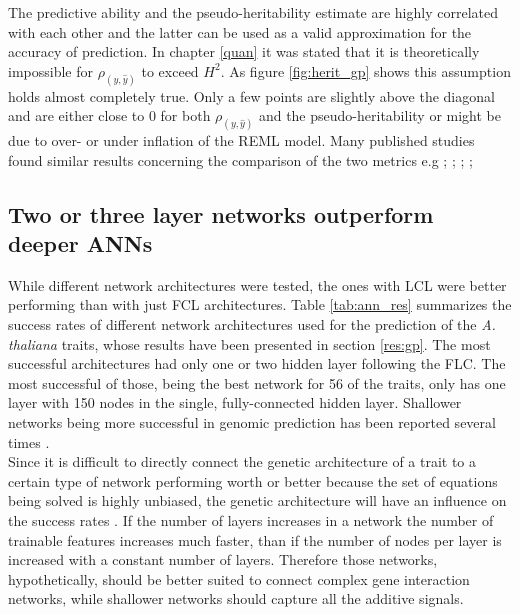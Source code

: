 The predictive ability and the pseudo-heritability estimate are highly correlated with each other
and the latter can be used as a valid approximation for the accuracy of prediction. In
chapter \ref{quan} it was stated that it is theoretically impossible for
$\rho_{(y,\hat{y})}$ to exceed $H^2$. As figure \ref{fig:herit_gp} shows this assumption
holds almost completely true. Only a few points are slightly above the diagonal and are
either close to 0 for both $\rho_{(y,\hat{y})}$ and the pseudo-heritability or might be
due to over- or under inflation of the REML model. Many published studies found similar
results concerning the comparison of the two metrics e.g \cite{kwong2017genomic}; \cite{morgante2018effect}; \cite{yap2018misestimation}; \cite{piaskowski2018genomic}; \cite{zhang2019factors}


\subsection{Two or three layer networks outperform deeper ANNs}

While different network architectures were tested, the ones with LCL were better performing
than with just FCL architectures. Table \ref{tab:ann_res} summarizes the success rates of
different network architectures used for the prediction of the \textit{A. thaliana}
traits, whose results have been presented in section \ref{res:gp}. The most successful
architectures had only one or two hidden layer following the FLC. The most successful of
those, being the best network for 56 of the traits, only has one layer with 150 nodes in
the single, fully-connected hidden layer. Shallower networks being more successful
in genomic prediction has been reported several times \cite{azodi2019}.\\
Since it is difficult to directly connect the genetic architecture of a trait to a certain
type of network performing worth or better because the set of equations being solved is
highly unbiased, the genetic architecture will have an influence on the success rates
\cite{gianola2013}. If the number of layers increases in a network the number of trainable
features increases much faster, than if the number of nodes per layer is increased with a
constant number of layers. Therefore those networks, hypothetically, should be better
suited to connect complex gene interaction networks, while shallower networks should
capture all the additive signals.


